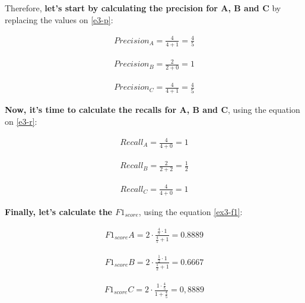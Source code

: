 \documentclass[12pt]{article}
\begin{document}
\begin{enumerate}[leftmargin=\labelsep]
    Therefore, \textbf{let's start by calculating the precision for A, B and C} by replacing the values on \eqref{e3-p}:

    \[
        \begin{aligned}
            Precision_A = \frac{4}{4+1} = \frac{4}{5}
        \end{aligned}
    \]

    \[
        \begin{aligned}
            Precision_B = \frac{2}{2+0} = 1
        \end{aligned}
    \]

    \[
        \begin{aligned}
            Precision_C = \frac{4}{4+1} = \frac{4}{5}
        \end{aligned}
    \]


    \textbf{Now, it's time to calculate the recalls for A, B and C}, using the equation on \eqref{e3-r}:

    \[
        \begin{aligned}
            Recall_A = \frac{4}{4+0} = 1
        \end{aligned}
    \]

    \[
        \begin{aligned}
            Recall_B = \frac{2}{2+2} = \frac{1}{2}
        \end{aligned}
    \]

    \[
        \begin{aligned}
            Recall_C = \frac{4}{4+0} = 1
        \end{aligned}
    \]

    \textbf{Finally, let's calculate the $F1_{score}$}, using the equation \eqref{ex3-f1}:

    \[
        \begin{aligned}
            F1_{score} A = 2 \cdot \frac{{ \frac{4}{5} \cdot 1 }}{{ \frac{4}{5} + 1 }} = 0.8889
        \end{aligned}
    \]

    \[
        \begin{aligned}
            F1_{score} B = 2 \cdot \frac{{ \frac{1}{2} \cdot 1 }}{{ \frac{1}{2} + 1 }} = 0.6667
        \end{aligned}
    \]

    \[
        \begin{aligned}
            F1_{score} C = 2 \cdot \frac{{ 1 \cdot \frac{4}{5} }}{{ 1 + \frac{4}{5} }} = 0,8889
        \end{aligned}
    \]


\end{enumerate}
\end{document}
